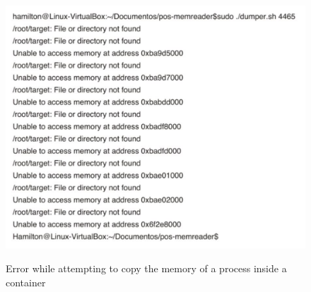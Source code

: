 \documentclass[conference]{IEEEtran}
\newcommand{\marcos}[1]{{\color{green}{MARCOS: #1}}}
\newcommand{\fancyname}{Dizang}
\begin{document}
\begin{figure}[htb!]
\footnotesize
\caption{Error while attempting to copy the memory of a process inside a container \marcos{Er... o que texto em português está fazendo nesta figura?!?!?!!? - Hamilton: Traduzido}}
\includegraphics[scale=0.32]{nao-consido-dumpar-memoria.pdf}
\centering
\label{fig:erro-copia-gdb}
\end{figure}


%
%
%
%
%
\end{document}
